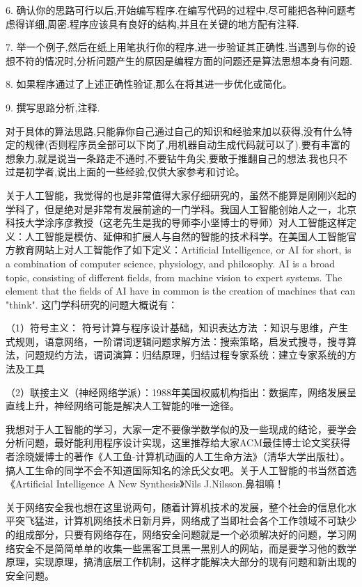 6. 确认你的思路可行以后,开始编写程序.在编写代码的过程中,尽可能把各种问题考虑得详细,周密.程序应该具有良好的结构,并且在关键的地方配有注释.

7. 举一个例子,然后在纸上用笔执行你的程序,进一步验证其正确性.当遇到与你的设想不符的情况时,分析问题产生的原因是编程方面的问题还是算法思想本身有问题.

8. 如果程序通过了上述正确性验证,那么在将其进一步优化或简化。

9. 撰写思路分析,注释.


对于具体的算法思路,只能靠你自己通过自己的知识和经验来加以获得,没有什么特定的规律(否则程序员全部可以下岗了,用机器自动生成代码就可以了).要有丰富的想象力,就是说当一条路走不通时,不要钻牛角尖,要敢于推翻自己的想法.我也只不过是初学者,说出上面的一些经验,仅供大家参考和讨论。


关于人工智能，我觉得的也是非常值得大家仔细研究的，虽然不能算是刚刚兴起的学科了，但是绝对是非常有发展前途的一门学科。我国人工智能创始人之一，北京科技大学涂序彦教授（这老先生是我的导师李小坚博士的导师）对人工智能这样定义：人工智能是模仿、延伸和扩展人与自然的智能的技术科学。在美国人工智能官方教育网站上对人工智能作了如下定义：Artificial Intelligence, or AI for short, is a combination of computer science, physiology, and philosophy. AI is a broad topic, consisting of different fields, from machine vision to expert systems. The element that the fields of AI have in common is the creation of machines that can "think". 
这门学科研究的问题大概说有：

（1）符号主义： 符号计算与程序设计基础，知识表达方法 ：知识与思维，产生式规则，语意网络，一阶谓词逻辑问题求解方法：搜索策略，启发式搜寻，搜寻算法，问题规约方法，谓词演算：归结原理，归结过程专家系统：建立专家系统的方法及工具

（2）联接主义（神经网络学派）：1988年美国权威机构指出：数据库，网络发展呈直线上升，神经网络可能是解决人工智能的唯一途径。

我想对于人工智能的学习，大家一定不要像学数学似的及一些现成的结论，要学会分析问题，最好能利用程序设计实现，这里推荐给大家ACM最佳博士论文奖获得者涂晓媛博士的著作《人工鱼-计算机动画的人工生命方法》（清华大学出版社）。搞人工生命的同学不会不知道国际知名的涂氏父女吧。关于人工智能的书当然首选《Artificial Intelligence A New Synthesis》Nils J.Nilsson.鼻祖嘛！


关于网络安全我也想在这里说两句，随着计算机技术的发展，整个社会的信息化水平突飞猛进，计算机网络技术日新月异，网络成了当即社会各个工作领域不可缺少的组成部分，只要有网络存在，网络安全问题就是一个必须解决好的问题，学习网络安全不是简简单单的收集一些黑客工具黑一黑别人的网站，而是要学习他的数学原理，实现原理，搞清底层工作机制，这样才能解决大部分的现有问题和新出现的安全问题。



